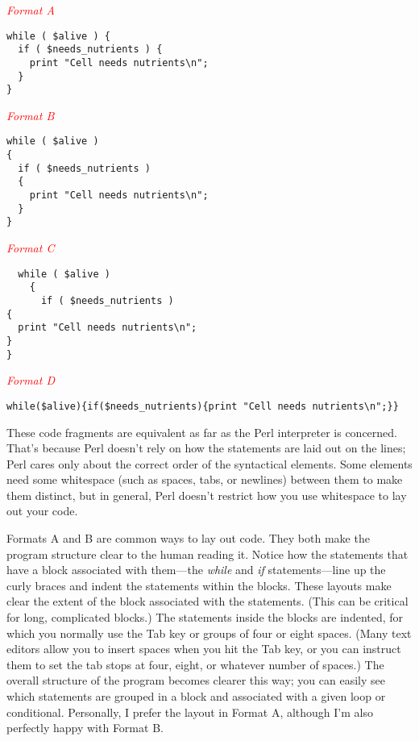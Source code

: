 \textcolor{red}{\textit{Format A}}
\begin{adjustwidth}{2em}{}
\begin{lstlisting}
while ( $alive ) {
  if ( $needs_nutrients ) {
    print "Cell needs nutrients\n";
  }
}
\end{lstlisting}
\end{adjustwidth}

\textcolor{red}{\textit{Format B}}
\begin{adjustwidth}{2em}{}
\begin{lstlisting}
while ( $alive )
{
  if ( $needs_nutrients )
  {
    print "Cell needs nutrients\n";
  }
}
\end{lstlisting}
\end{adjustwidth}

\textcolor{red}{\textit{Format C}}
\begin{adjustwidth}{2em}{}
\begin{lstlisting}
  while ( $alive )
    {
      if ( $needs_nutrients )
{
  print "Cell needs nutrients\n";
}
}
\end{lstlisting}
\end{adjustwidth}

\textcolor{red}{\textit{Format D}}
\begin{adjustwidth}{2em}{}
\begin{lstlisting}
while($alive){if($needs_nutrients){print "Cell needs nutrients\n";}}
\end{lstlisting}
\end{adjustwidth}

These code fragments are equivalent as far as the Perl interpreter is concerned. That's because Perl doesn't rely on how the statements are laid out on the lines; Perl cares only about the correct order of the syntactical elements. Some elements need some whitespace (such as spaces, tabs, or newlines) between them to make them distinct, but in general, Perl doesn't restrict how you use whitespace to lay out your code.

Formats A and B are common ways to lay out code. They both make the program structure clear to the human reading it. Notice how the statements that have a block associated with them—the \textit{while} and \textit{if} statements—line up the curly braces and indent the statements within the blocks. These layouts make clear the extent of the block associated with the statements. (This can be critical for long, complicated blocks.) The statements inside the blocks are indented, for which you normally use the Tab key or groups of four or eight spaces. (Many text editors allow you to insert spaces when you hit the Tab key, or you can instruct them to set the tab stops at four, eight, or whatever number of spaces.) The overall structure of the program becomes clearer this way; you can easily see which statements are grouped in a block and associated with a given loop or conditional. Personally, I prefer the layout in Format A, although I'm also perfectly happy with Format B.

